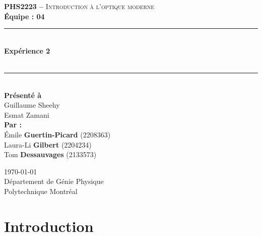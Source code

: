 \documentclass[11pt,letterpaper]{article}
\begin{document}
\begin{titlepage}
\center

\begin{figure}
\end{figure}
\vspace*{2 cm}

\textsc{\Large \textbf{PHS2223 --} Introduction à l'optique moderne}\\[0.5cm]
\large{\textbf{Équipe : 04}}\\[1.5cm]

\rule{\linewidth}{0.5mm} \\[0.5cm]
\Large{\textbf{Expérience 2}} \\[0.2cm]
\\
\rule{\linewidth}{0.2mm} \\[2.3cm]

\large{\textbf{Présenté à}\\
  Guillaume Sheehy\\
  Esmat Zamani\\[2.5cm]
  \textbf{Par :}\\
  Émile \textbf{Guertin-Picard} (2208363)\\
  Laura-Li \textbf{Gilbert} (2204234)\\
  Tom \textbf{Dessauvages} (2133573)\\[3cm]}

\large{\today\\
Département de Génie Physique\\
Polytechnique Montréal\\}

\end{titlepage}


\tableofcontents
{}
\newpage

\pagestyle{fancy}
\setlength{\headheight}{14pt}
\renewcommand{\headrulewidth}{0pt}
\fancyfoot[R]{\thepage}

\pagestyle{fancy}
\fancyhf{}
\renewcommand{\headrulewidth}{1pt}
\fancyhead[R]{\today}
\fancyfoot[R]{\thepage}

\setcounter{page}{1}


\section{Introduction}
\end{document}

